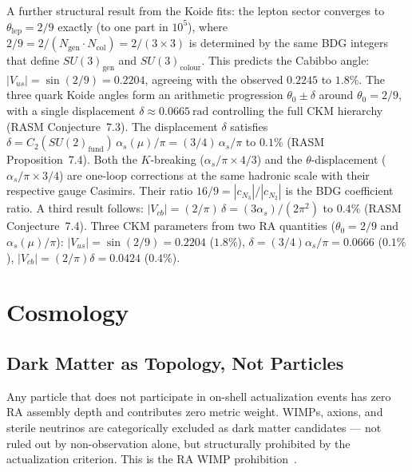 \documentclass[11pt,a4paper]{article}
\begin{document}
A further structural result from the Koide fits: the lepton sector
converges to $\theta_{\mathrm{lep}} = 2/9$ exactly (to one part in
$10^5$), where $2/9 = 2/(N_{\mathrm{gen}}\cdot N_{\mathrm{col}}) =
2/(3\times 3)$ is determined by the same BDG integers that define
$SU(3)_{\mathrm{gen}}$ and $SU(3)_{\mathrm{colour}}$. This predicts
the Cabibbo angle: $|V_{us}| = \sin(2/9) = 0.2204$, agreeing with the
observed $0.2245$ to $1.8\%$. The three quark Koide angles form an
arithmetic progression $\theta_0 \pm \delta$ around $\theta_0 = 2/9$,
with a single displacement $\delta \approx 0.0665~\mathrm{rad}$
controlling the full CKM hierarchy (RASM Conjecture~7.3).
The displacement $\delta$ satisfies $\delta =
C_2(SU(2)_{\mathrm{fund}})\,\alpha_s(\mu)/\pi = (3/4)\,\alpha_s/\pi$
to $0.1\%$ (RASM Proposition~7.4). Both the $K$-breaking
($\alpha_s/\pi \times 4/3$) and the $\theta$-displacement
($\alpha_s/\pi \times 3/4$) are one-loop corrections at the same
hadronic scale with their respective gauge Casimirs.
Their ratio $16/9 = |c_{N_3}|/|c_{N_2}|$ is the BDG coefficient ratio.
A third result follows: $|V_{cb}| = (2/\pi)\,\delta =
(3\alpha_s)/(2\pi^2)$ to $0.4\%$ (RASM Conjecture~7.4).
Three CKM parameters from two RA quantities ($\theta_0=2/9$ and
$\alpha_s(\mu)/\pi$):
$|V_{us}| = \sin(2/9) = 0.2204$ ($1.8\%$),
$\delta = (3/4)\alpha_s/\pi = 0.0666$ ($0.1\%$),
$|V_{cb}| = (2/\pi)\delta = 0.0424$ ($0.4\%$).

\section{Cosmology}
\label{sec:cosmology}

\subsection{Dark Matter as Topology, Not Particles}

Any particle that does not participate in on-shell actualization events
has zero RA assembly depth and contributes zero metric weight. WIMPs,
axions, and sterile neutrinos are categorically excluded as dark matter
candidates --- not ruled out by non-observation alone, but structurally
prohibited by the actualization criterion. This is the RA WIMP
prohibition~\citep{Sandeman2026RAGC}.
\end{document}
